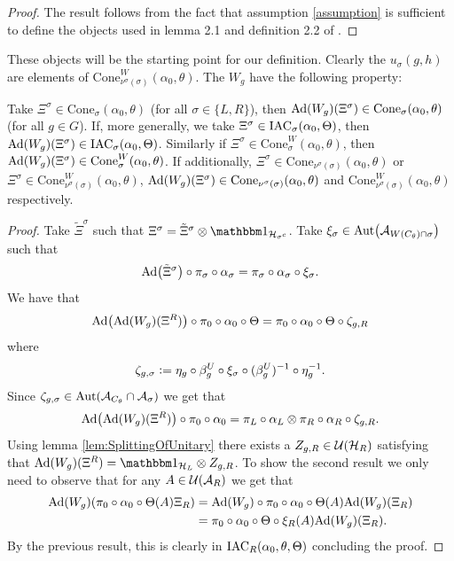 \documentclass[11pt,a4paper,twoside]{article}
\numberwithin{equation}{section}
\begin{document}
	\begin{proof}
		The result follows from the fact that assumption \ref{assumption} is sufficient to define the objects used in lemma 2.1 and definition 2.2 of \cite{ogata2021h3gmathbb}.
	\end{proof}
	These objects will be the starting point for our definition. Clearly the $u_\sigma(g,h)$ are elements of $\textrm{Cone}_{\nu^\sigma(\sigma)}^W(\alpha_0,\theta)$. The $W_g$ have the following property:
	\begin{lemma}\label{lem:AdjointOverConeIsInCone}
		Take $\Xi^{\sigma}\in\textrm{Cone}_\sigma(\alpha_0,\theta)$ (for all $\sigma\in\{L,R\}$), then $\Ad{W_g}(\Xi^\sigma)\in\textrm{Cone}_\sigma(\alpha_0,\theta)$ (for all $g\in G$). If, more generally, we take $\Xi^\sigma\in\textrm{IAC}_\sigma(\alpha_0,\Theta)$, then $\Ad{W_g}(\Xi^\sigma)\in\IAC_\sigma(\alpha_0,\Theta)$. Similarly if $\Xi^{\sigma}\in\textrm{Cone}_\sigma^W(\alpha_0,\theta)$, then $\Ad{W_g}(\Xi^\sigma)\in\textrm{Cone}_\sigma^W(\alpha_0,\theta)$. If additionally, $\Xi^{\sigma}\in\textrm{Cone}_{\nu^\sigma(\sigma)}(\alpha_0,\theta)$ or $\Xi^{\sigma}\in\textrm{Cone}_{\nu^\sigma(\sigma)}^W(\alpha_0,\theta)$, $\Ad{W_g}(\Xi^\sigma)\in\textrm{Cone}_{\nu^\sigma(\sigma)}(\alpha_0,\theta)$ and $\textrm{Cone}_{\nu^\sigma(\sigma)}^W(\alpha_0,\theta)$ respectively.
	\end{lemma}
	\begin{proof}
		Take $\tilde{\Xi}^\sigma$ such that $\Xi^\sigma=\tilde{\Xi}^\sigma\otimes\id_{\HH_{\sigma^c}}$. Take $\xi_\sigma\in\Aut{\AA_{W(C_\theta)\cap\sigma}}$ such that
		\begin{equation}
			\Ad{\tilde\Xi^\sigma}\circ\pi_\sigma\circ\alpha_\sigma=\pi_\sigma\circ\alpha_\sigma\circ \xi_\sigma.
		\end{equation}
		We have that
		\begin{equation}
			\Ad{\Ad{W_g}(\Xi^R)}\circ\pi_0\circ\alpha_0\circ\Theta=\pi_0\circ\alpha_0\circ\Theta\circ\zeta_{g,R}
		\end{equation}
		where
		\begin{equation}
			\zeta_{g,\sigma}\vcentcolon= \eta_g\circ\beta_g^{U}\circ\xi_\sigma\circ(\beta_g^{U})^{-1}\circ\eta_g^{-1}.
		\end{equation}
		Since $\zeta_{g,\sigma}\in\Aut{\AA_{C_\theta}\cap\AA_{\sigma}}$ we get that
		\begin{equation}
			\Ad{\Ad{W_g}(\Xi^R)}\circ\pi_0\circ\alpha_0=\pi_L\circ\alpha_L\otimes\pi_R\circ\alpha_R\circ\zeta_{g,R}.
		\end{equation}
		Using lemma \ref{lem:SplittingOfUnitary} there exists a $Z_{g,R}\in\mathcal U(\mathcal H_R)$ satisfying that $\Ad{W_g}(\Xi^R)=\id_{\HH_L}\otimes Z_{g,R}$. To show the second result we only need to observe that for any $A\in\mathcal U(\mathcal A_R)$ we get that
		\begin{align}
			\Ad{W_g}\left(\pi_0\circ\alpha_0\circ\Theta(A)\Xi_R\right)&=\Ad{W_g}\circ\pi_0\circ\alpha_0\circ\Theta(A)\Ad{W_g}(\Xi_R)\\
			&=\pi_0\circ\alpha_0\circ\Theta\circ\xi_R(A)\Ad{W_g}(\Xi_R).
		\end{align}
		By the previous result, this is clearly in $\textrm{IAC}_R(\alpha_0,\theta,\Theta)$ concluding the proof.
	\end{proof}
\end{document}
